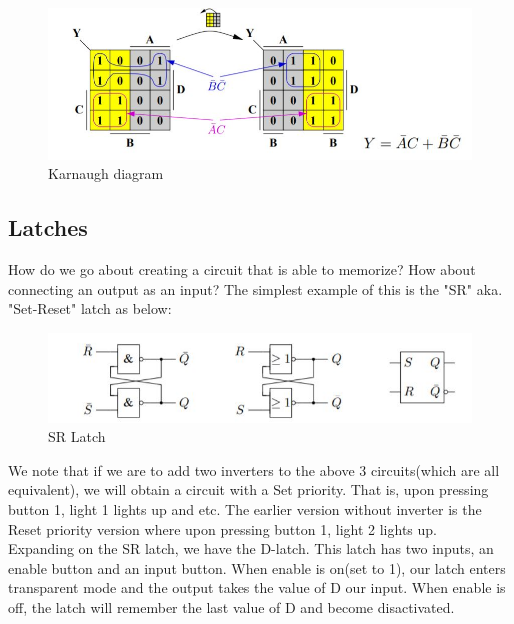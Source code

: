 \documentclass[titlepage]{article}
\begin{document}
\begin{figure}[H]
    \centering
    \includegraphics{src/bool2.JPG}
    \caption{Karnaugh diagram}
    \label{fig:my_label}
\end{figure}

\subsection{Latches}
How do we go about creating a circuit that is able to memorize? How about connecting an output as an input? The simplest example of this is the "SR" aka. "Set-Reset" latch as below:


\begin{figure}[H]
    \centering
    \includegraphics[scale = 0.7]{src/bool3.JPG}
    \caption{SR Latch}
    \label{fig:my_label}
\end{figure}

We note that if we are to add two inverters to the above 3 circuits(which are all equivalent), we will obtain a circuit with a Set priority. That is, upon pressing button 1, light 1 lights up and etc. The earlier version without inverter is the Reset priority version where upon pressing button 1, light 2 lights up. 
\\

Expanding on the SR latch, we have the D-latch. This latch has two inputs, an enable button and an input button. When enable is on(set to 1), our latch enters transparent mode and the output takes the value of D our input. When enable is off, the latch will remember the last value of D and become disactivated. 
\end{document}
